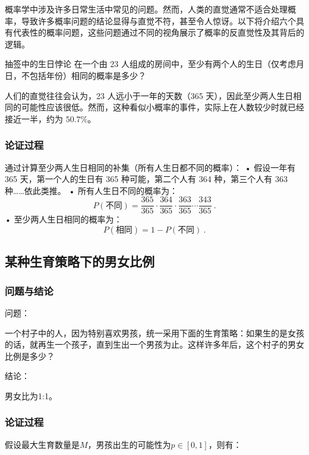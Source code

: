 
概率学中涉及许多日常生活中常见的问题。然而，人类的直觉通常不适合处理概率，导致许多概率问题的结论显得与直觉不符，甚至令人惊讶。以下将介绍六个具有代表性的概率问题，这些问题通过不同的视角展示了概率的反直觉性及其背后的逻辑。

\begin{example}{抽签中的生日悖论}
在一个由 23 人组成的房间中，至少有两个人的生日（仅考虑月日，不包括年份）相同的概率是多少？
\end{example}

人们的直觉往往会认为，23 人远小于一年的天数（365 天），因此至少两人生日相同的可能性应该很低。然而，这种看似小概率的事件，实际上在人数较少时就已经接近一半，约为 $50.7\%$。

\subsubsection{论证过程}

通过计算至少两人生日相同的补集（所有人生日都不同的概率）：
	•	假设一年有 365 天，第一个人的生日有 365 种可能，第二个人有 364 种，第三个人有 363 种……依此类推。
	•	所有人生日不同的概率为：
$$
P(\text{不同}) = \frac{365}{365} \cdot \frac{364}{365} \cdot \frac{363}{365} \cdots \frac{343}{365}~.
$$
	•	至少两人生日相同的概率为：
$$
P(\text{相同}) = 1 - P(\text{不同})~.
$$


\subsection{某种生育策略下的男女比例}

\subsubsection{问题与结论}

问题：

一个村子中的人，因为特别喜欢男孩，统一采用下面的生育策略：如果生的是女孩的话，就再生一个孩子，直到生出一个男孩为止。这样许多年后，这个村子的男女比例是多少？

结论：

男女比为1:1。

\subsubsection{论证过程}


假设最大生育数量是$M$，男孩出生的可能性为$p\in[0,1]$，则有：

